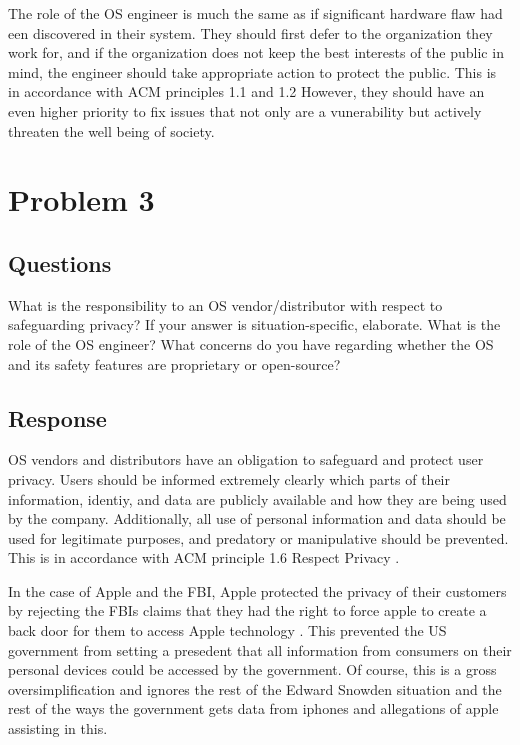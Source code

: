 \documentclass{assignment-x}
\begin{document}
The role of the OS engineer is much the same as if significant hardware flaw had een discovered in their system. They should first defer to the organization they work for, and if the organization does not keep the best interests of the public in mind, the engineer should take appropriate action to protect the public. This is in accordance with ACM principles 1.1 and 1.2 \cite{ACMCodeOfEthics} However, they should have an even higher priority to fix issues that not only are a vunerability but actively threaten the well being of society.

\section{Problem 3}
\subsection{Questions}
What is the responsibility to an OS vendor/distributor with respect to safeguarding privacy? If your answer is situation-specific, elaborate.
What is the role of the OS engineer? 
What concerns do you have regarding whether the OS and its safety features are proprietary or open-source?
\subsection{Response}
OS vendors and distributors have an obligation to safeguard and protect user privacy. Users should be informed extremely clearly which parts of their information, identiy, and data are publicly available and how they are being used by the company. Additionally, all use of personal information and data should be used for legitimate purposes, and predatory or manipulative should be prevented. This is in accordance with ACM principle 1.6 Respect Privacy \cite{ACMCodeOfEthics}. 

In the case of Apple and the FBI, Apple protected the privacy of their customers by rejecting the FBIs claims that they had the right to force apple to create a back door for them to access Apple technology \cite{apple_fbi_encryption_dispute_wikipedia}. This prevented the US government from setting a presedent that all information from consumers on their personal devices could be accessed by the government. Of course, this is a gross oversimplification and ignores the rest of the Edward Snowden \cite{snowden_guardian} situation and the rest of the ways the government gets data from iphones and allegations of apple assisting in this. 
\end{document}
